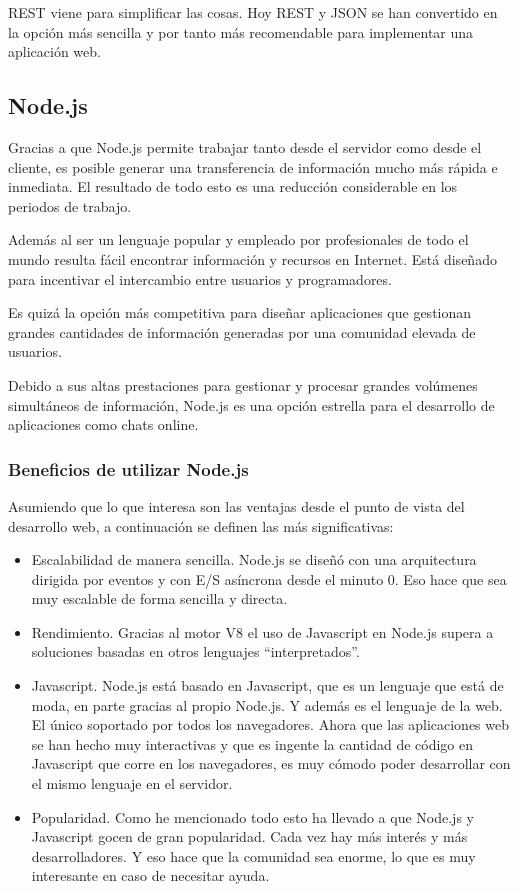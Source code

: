 REST viene para simplificar las cosas. Hoy REST y JSON se han convertido en la opción más sencilla y por tanto más recomendable para implementar una aplicación web.

\subsection{Node.js}

Gracias a que Node.js permite trabajar tanto desde el servidor como desde el cliente, es posible generar una transferencia de información mucho más rápida e inmediata. El resultado de todo esto es una reducción considerable en los periodos de trabajo.

Además al ser un lenguaje popular y empleado por profesionales de todo el mundo resulta fácil encontrar información y recursos en Internet. Está diseñado para incentivar el intercambio entre usuarios y programadores.

Es quizá la opción más competitiva para diseñar aplicaciones que gestionan grandes cantidades de información generadas por una comunidad elevada de usuarios.

Debido a sus altas prestaciones para gestionar y procesar grandes volúmenes simultáneos de información, Node.js es una opción estrella para el desarrollo de aplicaciones como chats online.

\subsubsection{Beneficios de utilizar Node.js}

Asumiendo que lo que interesa son las ventajas desde el punto de vista del desarrollo web, a continuación se definen las más significativas:

\begin{itemize}
  \item Escalabilidad de manera sencilla. Node.js se diseñó con una arquitectura dirigida por eventos y con E/S asíncrona desde el minuto 0. Eso hace que sea muy escalable de forma sencilla y directa.
  \item Rendimiento. Gracias al motor V8 el uso de Javascript en Node.js supera a soluciones basadas en otros lenguajes “interpretados”.
  \item Javascript. Node.js está basado en Javascript, que es un lenguaje que está de moda, en parte gracias al propio Node.js. Y además es el lenguaje de la web. El único soportado por todos los navegadores. Ahora que las aplicaciones web se han hecho muy interactivas y que es ingente la cantidad de código en Javascript que corre en los navegadores, es muy cómodo poder desarrollar con el mismo lenguaje en el servidor.
  \item Popularidad. Como he mencionado todo esto ha llevado a que Node.js y Javascript gocen de gran popularidad. Cada vez hay más interés y más desarrolladores. Y eso hace que la comunidad sea enorme, lo que es muy interesante en caso de necesitar ayuda.
\end{itemize}

